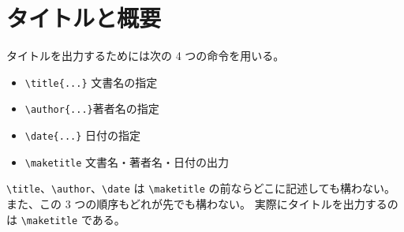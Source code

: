 \section{タイトルと概要}
タイトルを出力するためには次の 4 つの命令を用いる。
\begin{itemize}\setlength{\leftskip}{-1.00zw}%
\item \verb'\title{...}' 文書名の指定
\item \verb'\author{...}'著者名の指定
\item \verb'\date{...}'  日付の指定
\item \verb'\maketitle'  文書名・著者名・日付の出力
\end{itemize}
\verb'\title'、\verb'\author'、\verb'\date' は \verb'\maketitle' の前ならどこに記述しても構わない。
また、この 3 つの順序もどれが先でも構わない。
実際にタイトルを出力するのは \verb'\maketitle' である。\\

